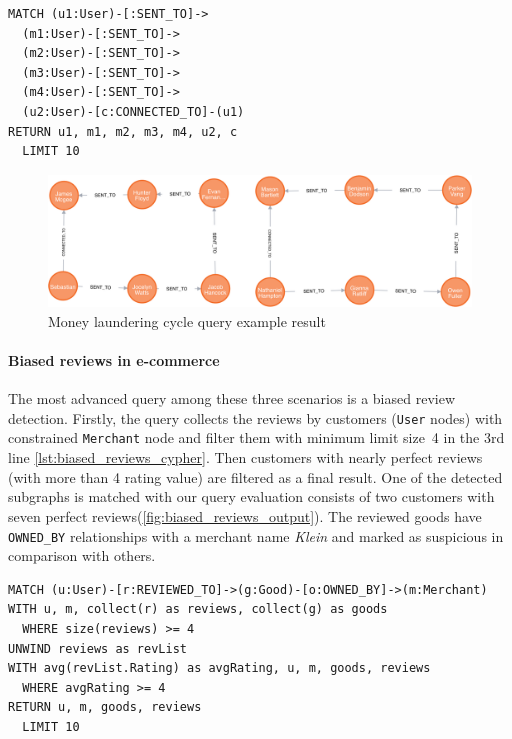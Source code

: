 \begin{lstlisting}[language=Cypher,frame=single,caption={Cypher money laundering cycle detection query},label={lst:money_laundering_cypher}]
MATCH (u1:User)-[:SENT_TO]->
  (m1:User)-[:SENT_TO]->
  (m2:User)-[:SENT_TO]->
  (m3:User)-[:SENT_TO]->
  (m4:User)-[:SENT_TO]->
  (u2:User)-[c:CONNECTED_TO]-(u1)
RETURN u1, m1, m2, m3, m4, u2, c
  LIMIT 10
\end{lstlisting}

\begin{figure}[!ht]
  \centering
  \includegraphics[width=\textwidth]{figures/cycle_output.png}
  \caption{Money laundering cycle query example result} 
  \label{fig:money_laundering_cycle_output}
\end{figure}

\paragraph{Biased reviews in e-commerce}

The most advanced query among these three scenarios is a biased review detection.
Firstly, the query collects the reviews by customers (\texttt{User} nodes) with constrained \texttt{Merchant} node and filter them with minimum limit size~4 in the 3rd line \autoref{lst:biased_reviews_cypher}.
Then customers with nearly perfect reviews (with more than 4 rating value) are filtered as a final result.
One of the detected subgraphs is matched with our query evaluation consists of two customers with seven perfect reviews(\autoref{fig:biased_reviews_output}).
The reviewed goods have \texttt{OWNED\_BY} relationships with a merchant name \textit{Klein} and marked as suspicious in comparison with others.

\begin{lstlisting}[language=Cypher,frame=single,caption={Cypher biased reviews detection query},label={lst:biased_reviews_cypher}]
MATCH (u:User)-[r:REVIEWED_TO]->(g:Good)-[o:OWNED_BY]->(m:Merchant)
WITH u, m, collect(r) as reviews, collect(g) as goods
  WHERE size(reviews) >= 4
UNWIND reviews as revList
WITH avg(revList.Rating) as avgRating, u, m, goods, reviews
  WHERE avgRating >= 4
RETURN u, m, goods, reviews
  LIMIT 10
\end{lstlisting}

